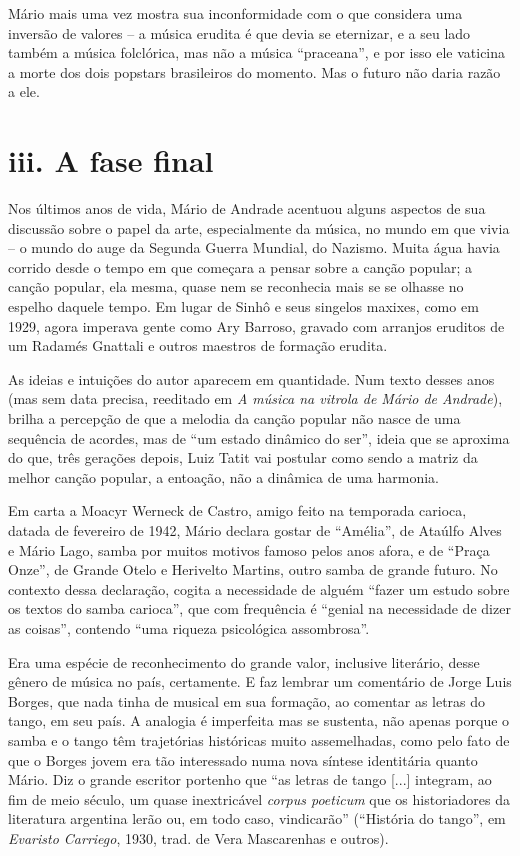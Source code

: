 Mário mais uma vez mostra sua inconformidade com o que considera uma
inversão de valores -- a música erudita é que devia se eternizar, e a
seu lado também a música folclórica, mas não a música ``praceana'', e
por isso ele vaticina a morte dos dois popstars brasileiros do momento.
Mas o futuro não daria razão a ele.

\section{iii. A fase final}

Nos últimos anos de vida, Mário de Andrade acentuou alguns aspectos de
sua discussão sobre o papel da arte, especialmente da música, no mundo
em que vivia -- o mundo do auge da Segunda Guerra Mundial, do Nazismo.
Muita água havia corrido desde o tempo em que começara a pensar sobre a
canção popular; a canção popular, ela mesma, quase nem se reconhecia
mais se se olhasse no espelho daquele tempo. Em lugar de Sinhô e seus
singelos maxixes, como em 1929, agora imperava gente como Ary Barroso,
gravado com arranjos eruditos de um Radamés Gnattali e outros maestros
de formação erudita.

As ideias e intuições do autor aparecem em quantidade. Num texto desses
anos (mas sem data precisa, reeditado em \emph{A música na vitrola de
Mário de Andrade}), brilha a percepção de que a melodia da canção
popular não nasce de uma sequência de acordes, mas de ``um estado
dinâmico do ser'', ideia que se aproxima do que, três gerações depois,
Luiz Tatit vai postular como sendo a matriz da melhor canção popular, a
entoação, não a dinâmica de uma harmonia.

Em carta a Moacyr Werneck de Castro, amigo feito na temporada carioca,
datada de fevereiro de 1942, Mário declara gostar de ``Amélia'', de
Ataúlfo Alves e Mário Lago, samba por muitos motivos famoso pelos anos
afora, e de ``Praça Onze'', de Grande Otelo e Herivelto Martins, outro
samba de grande futuro. No contexto dessa declaração, cogita a
necessidade de alguém ``fazer um estudo sobre os textos do samba
carioca'', que com frequência é ``genial na necessidade de dizer as
coisas'', contendo ``uma riqueza psicológica assombrosa''.

Era uma espécie de reconhecimento do grande valor, inclusive literário,
desse gênero de música no país, certamente. E faz lembrar um comentário
de Jorge Luis Borges, que nada tinha de musical em sua formação, ao
comentar as letras do tango, em seu país. A analogia é imperfeita mas se
sustenta, não apenas porque o samba e o tango têm trajetórias históricas
muito assemelhadas, como pelo fato de que o Borges jovem era tão
interessado numa nova síntese identitária quanto Mário. Diz o grande
escritor portenho que ``as letras de tango {[}...{]} integram, ao fim de
meio século, um quase inextricável \emph{corpus poeticum} que os
historiadores da literatura argentina lerão ou, em todo caso,
vindicarão'' (``História do tango'', em \emph{Evaristo Carriego}, 1930,
trad. de Vera Mascarenhas e outros).

